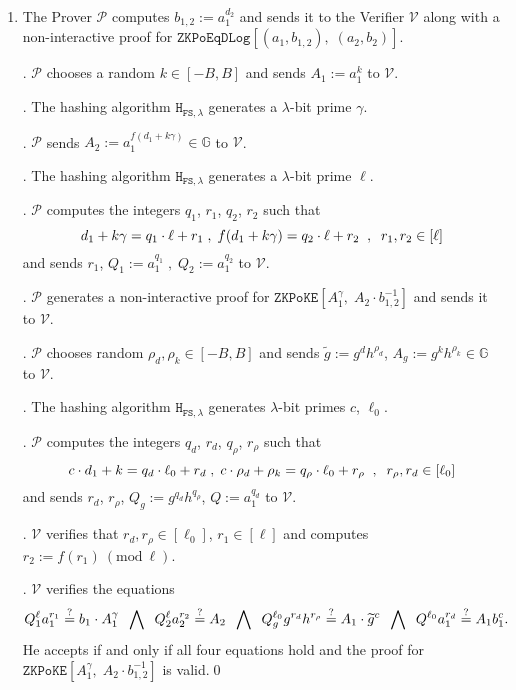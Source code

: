 \documentclass[11pt, lettersize, notitlepage, leqno, footskip=0.6cm]{article}
\newcommand{\ttt}{\texttt}
\newcommand{\bG}{\mathbb{G}}
\newcommand{\wti}{\widetilde}
\newcommand{\mc}{\mathcal}
\newcommand{\lam}{\lambda}
\newcommand{\mP}{\mc{P}}
\newcommand{\V}{\mc{V}}
\newcommand{\vs}{\vspace{-0.15cm}}
\newcommand{\noin}{\noindent}
\newcommand{\sta}{\stackrel{?}{=}}
\newcommand{\Mod}[1]{\ (\mathrm{mod}\ #1)}
\numberwithin{equation}{section}
\begin{document}
\begin{enumerate}[wide, labelwidth=!, labelindent=0pt]\vs \item  The Prover $\mP$ computes $b_{1,2}:= a_1^{d_2}$ and sends it to the Verifier $\V$ along with a non-interactive proof for $\ttt{ZKPoEqDLog}[(a_1,b_{1,2}),\;(a_2,b_2)]$.

\noin 2. $\mP$ chooses a random $k\in[-B,B]$ and sends $A_1:= a_1^{k}$ to $\V$.

\noin 3. The hashing algorithm $\ttt{H}_{\ttt{FS},\lam}$ generates a $\lam$-bit prime $\gamma$.

\noin 4. $\mP$ sends $A_2:= a_1^{f(d_1+k\gamma)}\in\bG$ to $\V$.

\noin 5. The hashing algorithm $\ttt{H}_{\ttt{FS},\lam}$ generates a $\lam$-bit prime $\ell$.

\noin 6. $\mP$ computes the integers $q_1$, $r_1$, $q_2$, $r_2$ such that \vs $$d_1+k\gamma = q_1\cdot \ell + r_1\;,\; f(d_1+k\gamma) = q_2\cdot \ell + r_2\;\;,\;\;r_1,r_2\in [\ell]   \vs $$ and sends $r_1$, $Q_1:= a_1^{q_1}\;,\; Q_2:= a_1^{q_2}$ to $\V$.

\noin 7. $\mP$ generates a non-interactive proof for $\ttt{ZKPoKE}[A_1^{\gamma},\; A_2\cdot b_{1,2}^{-1}]$ and sends it to $\V$.

\noin 8. $\mP$ chooses random $\rho_d,\rho_k\in [-B, B]$ and sends $\wti{g}:= g^d h^{\rho_d}$, $A_g:= g^k h^{\rho_k}\in \bG$ to $\V$.

\noin 9. The hashing algorithm $\ttt{H}_{\ttt{FS},\lam}$ generates $\lam$-bit primes $c$, $\ell_0$. 

\noin 10. $\mP$ computes the integers $q_d$, $r_d$, $q_{\rho}$, $r_{\rho}$ such that \vs $$c\cdot d_1 + k = q_d\cdot \ell_0 + r_d\;,\; c\cdot \rho_d + \rho_k = q_{\rho}\cdot \ell_0 + r_{\rho}\;\;,\;\;r_{\rho},r_d\in [\ell_0] \vs $$ and sends $r_{d}$, $r_{\rho}$, $Q_g:= g^{q_d}h^{q_{\rho}}$, $Q:= a_1^{q_d}$ to $\V$.

\noin 11. $\V$ verifies that $r_{d}, r_{\rho}\in [\ell_0]$, $r_1\in [\ell]$ and computes $r_2:= f(r_1)\Mod{\ell}$.

\noin 12. $\V$ verifies the equations \vs $$Q_1^{\ell}a_1^{r_1} \sta b_1 \cdot A_1^{\gamma}\;\;\bigwedge\;\; Q_2^{\ell}a_2^{r_2} \sta A_2 \;\;\bigwedge\;\; Q_g^{\ell_0}g^{r_d}h^{r_{\rho}}\sta A_1\cdot \wti{g}^c \;\;\bigwedge\;\; Q^{\ell_0}a_1^{r_d}\sta A_1 b_1^c .\vs $$ He accepts if and only if all four equations hold and the proof for $\ttt{ZKPoKE}[A_1^{\gamma},\; A_2\cdot b_{1,2}^{-1}]$ is valid.\qed \end{enumerate}
\end{document}
